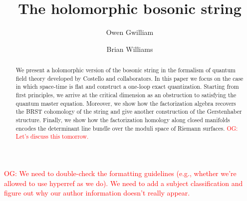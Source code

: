 \documentclass{conm-p-l}
\theoremstyle{definition}
\theoremstyle{remark}
\numberwithin{equation}{section}
\def\owen{\textcolor{red}{OG: }\textcolor{red}}
\begin{document}
\title{The holomorphic bosonic string}

\author{Owen Gwilliam}
\address{Max Planck Institute for Mathematics, Bonn, Germany}

\author{Brian Williams}
\address{Department of Mathematics, Northwestern University, Evanston, IL}

\date{}

\begin{abstract}
We present a holomorphic version of the bosonic string in the formalism of quantum field theory developed by Costello and collaborators. In this paper we focus on the case in which space-time is flat and construct a one-loop exact quantization. Starting from first principles, we arrive at the critical dimension as an obstruction to satisfying the quantum master equation. Moreover, we show how the factorization algebra recovers the BRST cohomology of the string and give another construction of the Gerstenhaber structure. Finally, we show how the factorization homology along closed manifolds encodes the determinant line bundle over the moduli space of Riemann surfaces.
\owen{Let's discuss this tomorrow.}
\end{abstract}

\maketitle


\setcounter{tocdepth}{1}

\tableofcontents

\owen{We need to double-check the formatting guidelines (e.g., whether we're allowed to use hyperref as we do). We need to add a subject classification and figure out why our author information doesn't really appear.}













\end{document}
